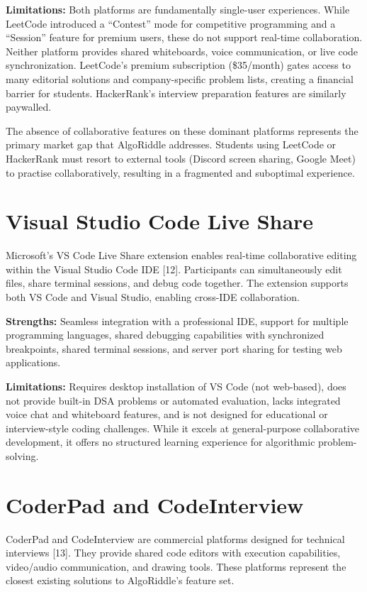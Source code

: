 \textbf{Limitations:} Both platforms are fundamentally single-user experiences. While LeetCode introduced a ``Contest'' mode for competitive programming and a ``Session'' feature for premium users, these do not support real-time collaboration. Neither platform provides shared whiteboards, voice communication, or live code synchronization. LeetCode's premium subscription (\$35/month) gates access to many editorial solutions and company-specific problem lists, creating a financial barrier for students. HackerRank's interview preparation features are similarly paywalled.

The absence of collaborative features on these dominant platforms represents the primary market gap that AlgoRiddle addresses. Students using LeetCode or HackerRank must resort to external tools (Discord screen sharing, Google Meet) to practise collaboratively, resulting in a fragmented and suboptimal experience.

\section{Visual Studio Code Live Share}

Microsoft's VS Code Live Share extension enables real-time collaborative editing within the Visual Studio Code IDE [12]. Participants can simultaneously edit files, share terminal sessions, and debug code together. The extension supports both VS Code and Visual Studio, enabling cross-IDE collaboration.

\textbf{Strengths:} Seamless integration with a professional IDE, support for multiple programming languages, shared debugging capabilities with synchronized breakpoints, shared terminal sessions, and server port sharing for testing web applications.

\textbf{Limitations:} Requires desktop installation of VS Code (not web-based), does not provide built-in DSA problems or automated evaluation, lacks integrated voice chat and whiteboard features, and is not designed for educational or interview-style coding challenges. While it excels at general-purpose collaborative development, it offers no structured learning experience for algorithmic problem-solving.

\section{CoderPad and CodeInterview}

CoderPad and CodeInterview are commercial platforms designed for technical interviews [13]. They provide shared code editors with execution capabilities, video/audio communication, and drawing tools. These platforms represent the closest existing solutions to AlgoRiddle's feature set.

